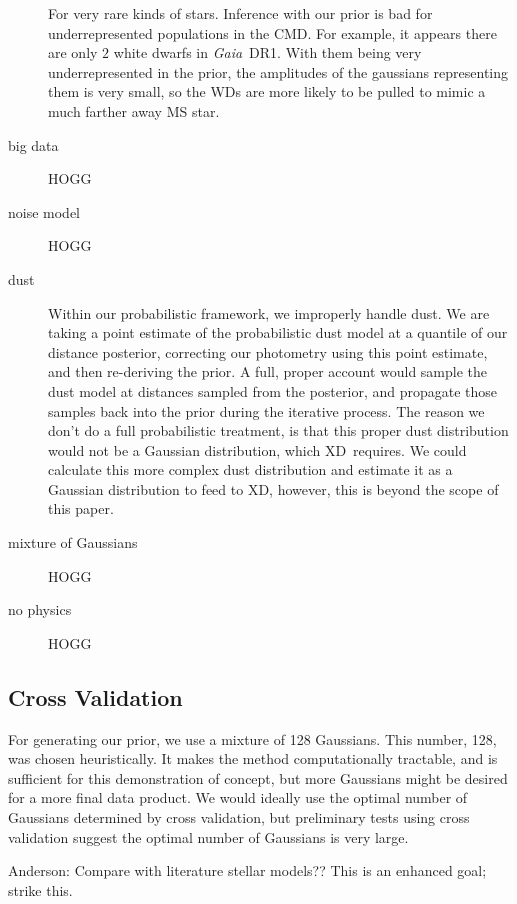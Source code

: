 \documentclass[modern]{aastex61}
\newcommand\BLcomment[1]{{\color{cyan}{[BL: #1]}}}
\newcommand{\acronym}[1]{{\small{#1}}}
\newcommand{\project}[1]{\textsl{#1}}
\newcommand{\gaia}{\project{Gaia}}
\newcommand{\xd}{\acronym{XD}}
\newcommand{\cmd}{\acronym{CMD}}
\begin{document}
\begin{description}
  For very rare kinds of stars. Inference with our prior is bad for
  underrepresented populations in the \cmd. For example, it appears
  there are only $2$ white dwarfs in \gaia\ DR1. With them being very
  underrepresented in the prior, the amplitudes of the gaussians
  representing them is very small, so the WDs are more likely to be
  pulled to mimic a much farther away MS star.
\item[big data] HOGG 
\item[noise model] HOGG
\item[dust] Within our probabilistic framework, we improperly handle
  dust. We are taking a point estimate of the probabilistic dust model
  at a quantile of our distance posterior, correcting our photometry
  using this point estimate, and then re-deriving the prior. A full,
  proper account would sample the dust model at distances sampled from
  the posterior, and propagate those samples back into the prior
  during the iterative process. The reason we don't do a full
  probabilistic treatment, is that this proper dust distribution would
  not be a Gaussian distribution, which \xd\ requires. We could
  calculate this more complex dust distribution and estimate it as a
  Gaussian distribution to feed to \xd, however, this is beyond the
  scope of this paper.
\item[mixture of Gaussians] HOGG
\item[no physics] HOGG
\end{description}

\subsection{Cross Validation}
For generating our prior, we use a mixture of 128 Gaussians. This number, 128, was chosen heuristically. It makes the method computationally tractable, and is sufficient for this demonstration of concept, but more Gaussians might be desired for a more final data product. We would ideally use the optimal number of Gaussians determined by cross validation, but preliminary tests using cross validation suggest the optimal number of Gaussians is very large.

Anderson: Compare with literature stellar models?? This is an enhanced goal; strike this.

\BLcomment{it's weird to end with these subsections. Cross-validation should go in the methods part (I think there is a flag there already), and the discussion of assumptions should go in the discussion. There should be a conclusion and look towards the future.}
\end{document}
